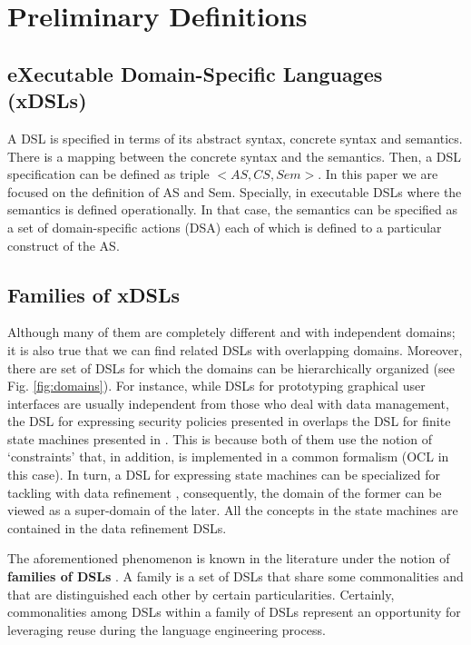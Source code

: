 \section{Preliminary Definitions}
\label{sec:basicconcepts}

\subsection{eXecutable Domain-Specific Languages (xDSLs)}

A DSL is specified in terms of its abstract syntax, concrete syntax and semantics. There is a mapping between the concrete syntax and the semantics. Then, a DSL specification can be defined as triple $<AS, CS, Sem>$. In this paper we are focused on the definition of AS and Sem. Specially, in executable DSLs where the semantics is defined operationally. In that case, the semantics can be specified as a set of domain-specific actions (DSA) each of which is defined to a particular construct of the AS. 

\subsection{Families of xDSLs}

Although many of them are completely different and with independent domains; it is also true that we can find related DSLs with overlapping domains. Moreover, there are set of DSLs for which the domains can be hierarchically organized \cite[p. 60-61]{voelter:2013} (see Fig. \ref{fig:domains}). For instance, while DSLs for prototyping graphical user interfaces are usually independent from those who deal with data management, the DSL for expressing security policies presented in \cite{Lodderstedt:2002} overlaps the DSL for finite state machines presented in \cite{Hamann:2012}. This is because both of them use the notion of `constraints' that, in addition, is implemented in a common formalism (OCL in this case). In turn, a DSL for expressing state machines can be specialized for tackling with data refinement \cite{Schewe:2008}, consequently, the domain of the former can be viewed as a super-domain of the later. All the concepts in the state machines are contained in the data refinement DSLs. 

The aforementioned phenomenon is known in the literature under the notion of \textbf{families of DSLs} \cite{Zschaler:2010b}. A family is a set of DSLs that share some commonalities and that are distinguished each other by certain particularities. Certainly, commonalities among DSLs within a family of DSLs represent an opportunity for leveraging reuse during the language engineering process.

